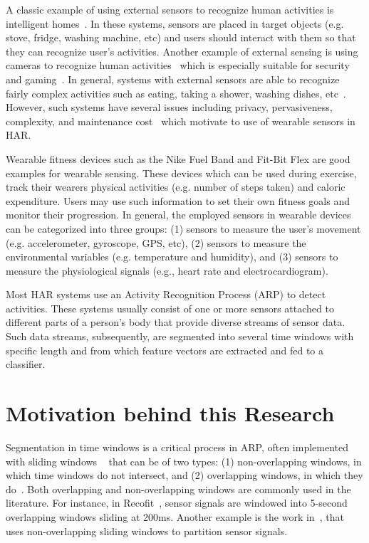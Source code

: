A classic example of using external sensors to recognize human activities is intelligent homes~\citep{kasteren2010activity,tolstikov2011comparison,yang2011activity,sarkar2011gpars}. In these systems, sensors are placed in target objects (e.g. stove, fridge, washing machine, etc) and users should interact with them so that they can recognize user's activities. Another example of external sensing is using cameras to recognize human activities~\citep{turaga2008machine,candamo2009understanding,joseph2010framework,ahad2008human} which is especially suitable for security and gaming~\citep{shotton2011real}. In general, systems with external sensors are able to recognize fairly complex activities such as eating, taking a shower, washing dishes, etc~\citep{lara2012survey}. However, such systems have several issues including privacy, pervasiveness, complexity, and maintenance cost~\citep{lara2012survey} which motivate to use of wearable sensors in HAR.

Wearable fitness devices such as the Nike Fuel Band and Fit-Bit Flex are good examples for wearable sensing. These devices which can be used during exercise, track their wearers physical activities (e.g. number of steps taken) and caloric expenditure. Users may use such information to set their own fitness goals and monitor their progression. In general, the employed sensors in wearable devices can be categorized into three groups: (1) sensors to measure the user's movement (e.g. accelerometer, gyroscope, GPS, etc), (2) sensors to measure the environmental variables (e.g. temperature and humidity), and (3) sensors to measure the physiological signals (e.g., heart rate and electrocardiogram).      


Most HAR systems use an Activity 
Recognition Process (ARP) to detect activities. These systems usually consist of one or more sensors attached to different parts of a person's body that provide diverse streams of sensor data. Such data streams, subsequently, are segmented into several time windows with specific length and from which feature vectors are extracted and fed to a classifier. 

\section{Motivation behind this Research}
Segmentation in time windows is a critical process in ARP, often implemented with 
sliding windows ~\citep{janidarmian2017comprehensive,banos2014window} that can be of two types: (1) non-overlapping windows, in which time windows do not intersect, and (2) overlapping windows, in which they do~\citep{lara2012survey}.
Both overlapping and non-overlapping windows are commonly used in the literature. For instance, in Recofit~\citep{morris2014recofit}, sensor signals are windowed into 5-second overlapping windows sliding at 200ms. Another example is the work in~\citep{banos2014window}, that uses non-overlapping sliding windows to partition sensor signals. 

